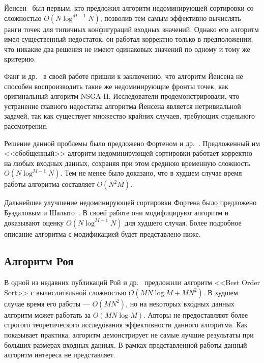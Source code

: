 Йенсен~\cite{jensen03} был первым, кто предложил алгоритм недоминирующей сортировки со сложностью $O(N\log^{M-1}N)$, позволив тем самым эффективно вычислять ранги точек для типичных конфигураций входных значений.
Однако его алгоритм имел существенный недостаток: он работал корректно только в предположении, что никакие два решения не имеют одинаковых значений по одному и тому же критерию.

Фанг и др.~\cite{fang08} в своей работе пришли к заключению, что алгоритм Йенсена не способен воспроизводить такие же недоминирующие фронты точек, как оригинальный алгоритм NSGA-II.
Исследователи продемонстрировали, что устранение главного недостатка алгоритма Йенсена является нетривиальной задачей, так как существует множество крайних случаев, требующих отдельного рассмотрения.

Решение данной проблемы было предложено Фортеном и др.~\cite{fortin13}.
Предложенный им <<обобщенный>> алгоритм недоминирующей сортировки работает корректно на любых входных данных, сохраняя при этом среднюю временную сложность $O(N\log^{M-1}N)$.
Тем не менее было доказано, что в худшем случае время работы алгоритма составляет $O(N^2M)$.

Дальнейшее улучшение недоминирующей сортировки Фортена было предложено Буздаловым и Шалыто~\cite{buzdalov14}.
В своей работе они модифицируют алгоритм и доказывают оценку $O(N\log^{M-1}N)$ для худшего случая.
Более подробное описание алгоритма с модификацией будет представлено ниже.

\subsection{Алгоритм Роя}
В одной из недавних публикаций Рой и др.~\cite{roy16} предложили алгоритм <<Best Order Sort>> с вычислительной сложностью $O(MN\log{M}+MN^2)$.
В худшем случае время его работы --- $O(MN^2)$, но на некоторых входных данных алгоритм может работать за $O(MN\log{M})$.
Авторы не предоставляют более строгого теоретического исследования эффективности данного алгоритма.
Как показывает практика, алгоритм демонстрирует не самые лучшие результаты при больших размерах входных данных.
В рамках представленной работы данный алгоритм интереса не представляет.

